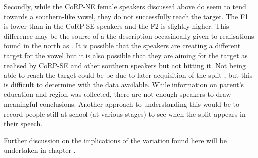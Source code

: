 \documentclass[../../../00.FullDoc/tex/ThesisSkeleton-draft2]{subfiles}
\begin{document}
Secondly, while the CoRP-NE female speakers discussed above do seem to tend towards a southern-like \strutt{} vowel, they do not successfully reach the target. The F1 is lower than in the CoRP-SE speakers and the F2 is slightly higher. This difference may be the source of a the description occasinoally given to \strutt{} realisations found in the north as  \citep{Braber2015,Jansen2020}. It is possible that the speakers are creating a different target for the \strutt{} vowel but it is also possible that they are aiming for the target as realised by CoRP-SE and other southern speakers but not hitting it. Not being able to reach the target could be be due to later acquisition of the split \citep{Evans2007} , but this is difficult to determine with the data available. While information on parent's education and region was collected, there are not enough speakers to draw meaningful conclusions. Another approach to understanding this would be to record people still at school (at various stages) to see when the \FS{} split appears in their speech.

Further discussion on the implications of the variation found here will be undertaken in chapter \notinsubfile{\ref{ch:Discussion}}.




\end{document}

